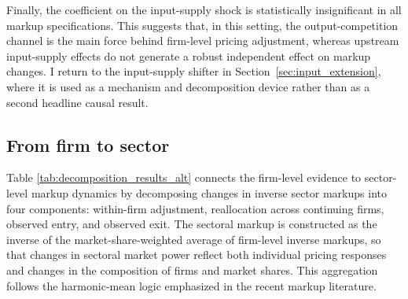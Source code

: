 ﻿\documentclass[12pt]{article}
\begin{document}
Finally, the coefficient on the input-supply shock is statistically insignificant in all markup specifications. This suggests that, in this setting, the output-competition channel is the main force behind firm-level pricing adjustment, whereas upstream input-supply effects do not generate a robust independent effect on markup changes. I return to the input-supply shifter in Section~\ref{sec:input_extension}, where it is used as a mechanism and decomposition device rather than as a second headline causal result.

\subsection{From firm to sector}

Table \ref{tab:decomposition_results_alt} connects the firm-level evidence to sector-level markup dynamics by decomposing changes in inverse sector markups into four components: within-firm adjustment, reallocation across continuing firms, observed entry, and observed exit. The sectoral markup is constructed as the inverse of the market-share-weighted average of firm-level inverse markups, so that changes in sectoral market power reflect both individual pricing responses and changes in the composition of firms and market shares. This aggregation follows the harmonic-mean logic emphasized in the recent markup literature.
\end{document}
